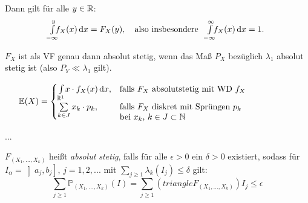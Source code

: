 \documentclass{cheat-sheet}
\renewcommand{\P}{\mathbb{P}} %
\newcommand{\E}{\mathbb{E}} %
\begin{document}
\begin{bem}
  Dann gilt für alle $y \in \mathbb{R}$:
  \[ \Int{\mathclap{-\infty}}{y}{f_X(x)}{x} = F_X(y), \quad \text{also insbesondere} \quad \Int{\mathclap{-\infty}}{\infty}{f_X(x)}{x} = 1. \]
\end{bem}

\begin{bem}
  $F_X$ ist als VF genau dann absolut stetig, wenn das Maß $P_X$ bezüglich $\lambda_1$ absolut stetig ist (also $P_Y \ll \lambda_1$ gilt).
\end{bem}



\begin{satz}\mbox{}\vspace{-16pt}
  \[ \E(X) = \begin{cases}
    \Int{\R^1}{}{x \cdot f_X(x)}{x}, & \text{falls $F_X$ absolutstetig mit WD $f_X$} \\
    \sum_{k \in J} x_k \cdot p_k, & \parbox[t]{.6\textwidth}{falls $F_X$ diskret mit Sprüngen $p_k$ \\ bei $x_k$, $k \in J \subset \N$}
  \end{cases} \]
\end{satz}
















...


$F_(X_1, ..., X_k)$ heißt \emph{absolut stetig}, falls für alle $\epsilon > 0$ ein $\delta > 0$ existiert, sodass für $I_{\alpha} = \left] a_j, b_j \right]$, $j = 1, 2, ...$ mit $\sum_{j \geq 1} \lambda_k(I_j) \leq \delta$ gilt:
\[ \sum_{j \geq 1} \P_{(X_1, ..., X_k)}(I) = \sum_{j \geq 1} (triangle F_{(X_1, ..., X_k)}) I_j \leq \epsilon \]
\end{document}
